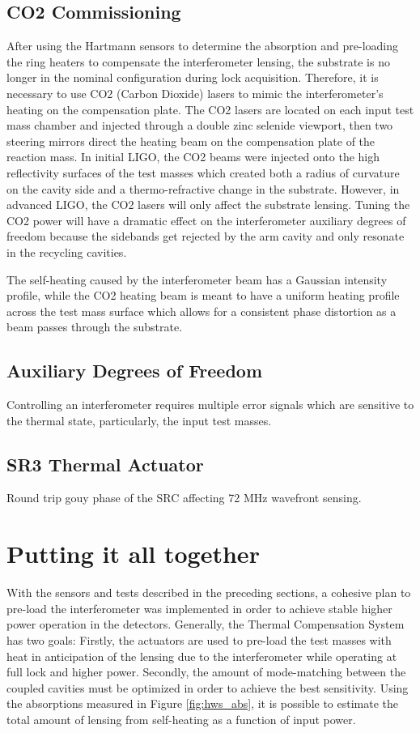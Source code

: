 	\subsection{CO2 Commissioning}\label{Sec:CO2}
	After using the Hartmann sensors to determine the absorption and pre-loading the ring heaters to compensate the interferometer lensing, the substrate is no longer in the nominal configuration during lock acquisition.  Therefore, it is necessary to use CO2 (Carbon Dioxide) lasers to mimic the interferometer's heating on the compensation plate.  The CO2 lasers are located on each input test mass chamber and injected through a double zinc selenide viewport, then two steering mirrors direct the heating beam on the compensation plate of the reaction mass.  In initial LIGO, the CO2 beams were injected onto the high reflectivity surfaces of the test masses which created both a radius of curvature on the cavity side and a thermo-refractive change in the substrate.  However, in advanced LIGO, the CO2 lasers will only affect the substrate lensing.  Tuning the CO2 power will have a dramatic effect on the interferometer auxiliary degrees of freedom because the sidebands get rejected by the arm cavity and only resonate in the recycling cavities.
	
	The self-heating caused by the interferometer beam has a Gaussian intensity profile, while the CO2 heating beam is meant to have a uniform heating profile across the test mass surface which allows for a consistent phase distortion as a beam passes through the substrate.
	
	\subsection{Auxiliary Degrees of Freedom}
	Controlling an interferometer requires multiple error signals which are sensitive to the thermal state, particularly, the input test masses.
	
	\subsection{SR3 Thermal Actuator}
	Round trip gouy phase of the SRC affecting 72 MHz wavefront sensing.
	
\section{Putting it all together}
	With the sensors and tests described in the preceding sections, a cohesive plan to pre-load the interferometer was implemented in order to achieve stable higher power operation in the detectors.  Generally, the Thermal Compensation System has two goals: Firstly, the actuators are used to pre-load the test masses with heat in anticipation of the lensing due to the interferometer while operating at full lock and higher power.  Secondly, the amount of mode-matching between the coupled cavities must be optimized in order to achieve the best sensitivity.  Using the absorptions measured in Figure \ref{fig:hws_abs}, it is possible to estimate the total amount of lensing from self-heating as a function of input power.
	
